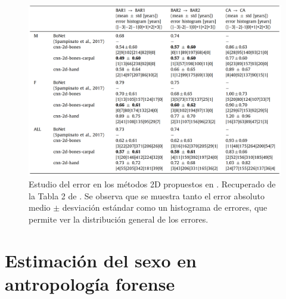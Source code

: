 \begin{figure}[htbp]
    \centering
    \includegraphics[width=\textwidth]{capitulos/cap_03/imagenes/error_study.png}
    \caption[
        Estudio del error en los métodos 2D propuestos en \cite{stern2019}.
    ]{
        Estudio del error en los métodos 2D propuestos en \cite{stern2019}. 
        Recuperado de la Tabla 2 de \cite{stern2019}. 
        Se observa que se muestra tanto el error absoluto medio $\pm$ desviación estándar como un histograma de errores, que permite ver la distribución general de los errores. 
    }
    \label{fig:error_study_stern2019}
\end{figure}



\section{Estimación del sexo en antropología forense}












